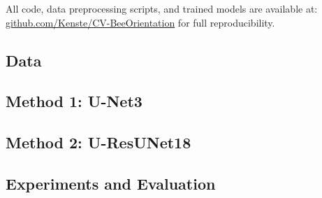 All code, data preprocessing scripts, and trained models are available at: \href{https://github.com/Kenste/CV-BeeOrientation}{github.com/Kenste/CV-BeeOrientation} for full reproducibility.

\subsection{Data}
\label{subse:data}


\subsection{Method 1: U-Net3}
\label{subsec:method1}


\subsection{Method 2: U-ResUNet18}
\label{subsec:method2}


\subsection{Experiments and Evaluation}
\label{subsec:evaluation}
